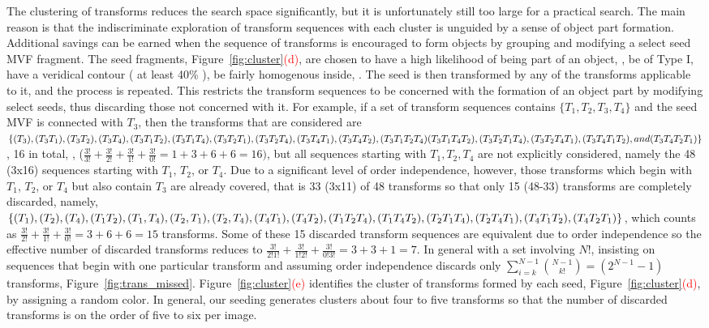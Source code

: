 The clustering of transforms reduces the search space significantly, but it is unfortunately still too large for a practical search. The main reason is that the indiscriminate exploration of transform sequences with each cluster is unguided by a sense of object part formation. Additional savings can be earned when the sequence of transforms is encouraged to form objects by grouping and modifying a select seed MVF fragment. The seed fragments, Figure~\ref{fig:cluster}\textcolor{red}{(d)}, are chosen to have a high likelihood of being part of an object, \ie, be of Type I, have a veridical contour ( at least 40\% ), be fairly homogenous inside, \etc. The seed is then transformed by any of the transforms applicable to it, and the process is repeated. This restricts the transform sequences to be concerned with the formation of an object part by modifying select seeds, thus discarding those not concerned with it. For example, if a set of transform sequences contains $\{T_1,T_2,T_3,T_4\}$ and the seed MVF is connected with $T_3$, then the transforms that are considered are $\{(T_3),(T_3T_1),(T_3T_2),(T_3T_4),(T_3T_1T_2),(T_3T_1T_4),(T_3T_2T_1),(T_3T_2T_4),(T_3T_4T_1),(T_3T_4T_2),\newline(T_3T_1T_2T_4)(T_3T_1T_4T_2),(T_3T_2T_1T_4),(T_3T_2T_4T_1),(T_3T_4T_1T_2), and (T_3T_4T_2T_1)\}$, 16 in total, \ie, ($\frac{3!}{3!}+\frac{3!}{2!}+\frac{3!}{1!}+\frac{3!}{0!}=1+3+6+6=16)$, but all sequences starting with $T_1,T_2,T_4$ are not explicitly considered, namely the 48 (3x16) sequences starting with $T_1$, $T_2$, or $T_4$. Due to a significant level of order independence, however, those transforms which begin with $T_1$, $T_2$, or $T_4$ but also contain $T_3$ are already covered, that is 33 (3x11) of 48 transforms so that only 15 (48-33) transforms are completely discarded, namely, $\{(T_1),(T_2),(T_4),(T_1T_2),(T_1,T_4),(T_2,T_1),(T_2,T_4),(T_4T_1),(T_4T_2),\newline(T_1T_2T_4),(T_1T_4T_2),(T_2T_1T_4),(T_2T_4T_1),(T_4T_1T_2),(T_4T_2T_1)\}$, which counts as $\frac{3!}{2!}+\frac{3!}{1!}+\frac{3!}{0!}=3+6+6=15$ transforms. Some of these 15 discarded transform sequences are equivalent due to order independence so the effective number of discarded transforms reduces to $\frac{3!}{2!1!}+\frac{3!}{1!2!}+\frac{3!}{0!3!}=3+3+1=7$. In general with a set involving $N!$, insisting on sequences that begin with one particular transform and assuming order independence discards only $\sum_{i=k}^{N-1}\binom{N-1}{k!}=(2^{N-1}-1)$ transforms, Figure~\ref{fig:trans_missed}. Figure~\ref{fig:cluster}\textcolor{red}{(e)} identifies the cluster of transforms formed by each seed, Figure~\ref{fig:cluster}\textcolor{red}{(d)}, by assigning a random color. In general, our seeding generates clusters about four to five transforms so that the number of discarded transforms is on the order of five to six per image. 

